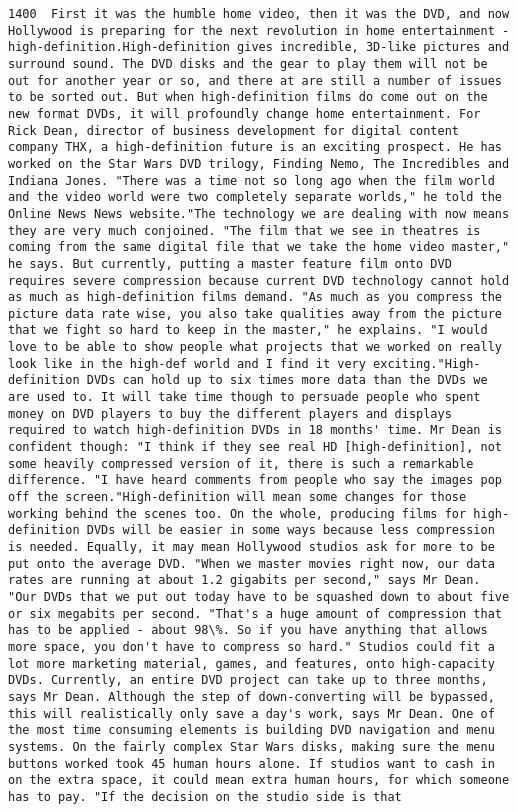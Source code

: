 \documentclass[11pt]{article}
\begin{document}
\begin{Verbatim}[commandchars=\\\{\}]
         1400  First it was the humble home video, then it was the DVD, and now Hollywood is preparing for the next revolution in home entertainment - high-definition.High-definition gives incredible, 3D-like pictures and surround sound. The DVD disks and the gear to play them will not be out for another year or so, and there at are still a number of issues to be sorted out. But when high-definition films do come out on the new format DVDs, it will profoundly change home entertainment. For Rick Dean, director of business development for digital content company THX, a high-definition future is an exciting prospect. He has worked on the Star Wars DVD trilogy, Finding Nemo, The Incredibles and Indiana Jones. "There was a time not so long ago when the film world and the video world were two completely separate worlds," he told the Online News News website."The technology we are dealing with now means they are very much conjoined. "The film that we see in theatres is coming from the same digital file that we take the home video master," he says. But currently, putting a master feature film onto DVD requires severe compression because current DVD technology cannot hold as much as high-definition films demand. "As much as you compress the picture data rate wise, you also take qualities away from the picture that we fight so hard to keep in the master," he explains. "I would love to be able to show people what projects that we worked on really look like in the high-def world and I find it very exciting."High-definition DVDs can hold up to six times more data than the DVDs we are used to. It will take time though to persuade people who spent money on DVD players to buy the different players and displays required to watch high-definition DVDs in 18 months' time. Mr Dean is confident though: "I think if they see real HD [high-definition], not some heavily compressed version of it, there is such a remarkable difference. "I have heard comments from people who say the images pop off the screen."High-definition will mean some changes for those working behind the scenes too. On the whole, producing films for high-definition DVDs will be easier in some ways because less compression is needed. Equally, it may mean Hollywood studios ask for more to be put onto the average DVD. "When we master movies right now, our data rates are running at about 1.2 gigabits per second," says Mr Dean. "Our DVDs that we put out today have to be squashed down to about five or six megabits per second. "That's a huge amount of compression that has to be applied - about 98\%. So if you have anything that allows more space, you don't have to compress so hard." Studios could fit a lot more marketing material, games, and features, onto high-capacity DVDs. Currently, an entire DVD project can take up to three months, says Mr Dean. Although the step of down-converting will be bypassed, this will realistically only save a day's work, says Mr Dean. One of the most time consuming elements is building DVD navigation and menu systems. On the fairly complex Star Wars disks, making sure the menu buttons worked took 45 human hours alone. If studios want to cash in on the extra space, it could mean extra human hours, for which someone has to pay. "If the decision on the studio side is that 
\end{Verbatim}
\end{document}
